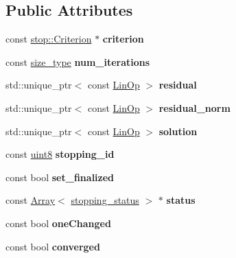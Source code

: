 \subsection*{Public Attributes}
\begin{DoxyCompactItemize}
\item 
\mbox{\label{structgko_1_1log_1_1criterion__data_aa0548110c547da9a8483927718884f4a}} 
const \hyperlink{classgko_1_1stop_1_1Criterion}{stop\+::\+Criterion} $\ast$ {\bfseries criterion}
\item 
\mbox{\label{structgko_1_1log_1_1criterion__data_afab8df7b4785439a9267bc652d6deb63}} 
const \hyperlink{namespacegko_a6e5c95df0ae4e47aab2f604a22d98ee7}{size\+\_\+type} {\bfseries num\+\_\+iterations}
\item 
\mbox{\label{structgko_1_1log_1_1criterion__data_adc825d1d8a8e1c69e172ee582319a82a}} 
std\+::unique\+\_\+ptr$<$ const \hyperlink{classgko_1_1LinOp}{Lin\+Op} $>$ {\bfseries residual}
\item 
\mbox{\label{structgko_1_1log_1_1criterion__data_a425258f5b1cb46ae3f117eace796a1f7}} 
std\+::unique\+\_\+ptr$<$ const \hyperlink{classgko_1_1LinOp}{Lin\+Op} $>$ {\bfseries residual\+\_\+norm}
\item 
\mbox{\label{structgko_1_1log_1_1criterion__data_a23bddbadadb1ce48d21d41f8ac515d10}} 
std\+::unique\+\_\+ptr$<$ const \hyperlink{classgko_1_1LinOp}{Lin\+Op} $>$ {\bfseries solution}
\item 
\mbox{\label{structgko_1_1log_1_1criterion__data_ae406ca3e9f745e24edf545d33efdd7ce}} 
const \hyperlink{namespacegko_a3950fc3732811a8563484e5098c31531}{uint8} {\bfseries stopping\+\_\+id}
\item 
\mbox{\label{structgko_1_1log_1_1criterion__data_a4c807636a64d3b1078572aac0c0ce95f}} 
const bool {\bfseries set\+\_\+finalized}
\item 
\mbox{\label{structgko_1_1log_1_1criterion__data_af795c317fb08a115e077fe30f27812c1}} 
const \hyperlink{classgko_1_1Array}{Array}$<$ \hyperlink{classgko_1_1stopping__status}{stopping\+\_\+status} $>$ $\ast$ {\bfseries status}
\item 
\mbox{\label{structgko_1_1log_1_1criterion__data_ac0008d49d33f2fa1f972fb98279bb162}} 
const bool {\bfseries one\+Changed}
\item 
\mbox{\label{structgko_1_1log_1_1criterion__data_aa8fe52a61886be70613da84cfb3868f8}} 
const bool {\bfseries converged}
\end{DoxyCompactItemize}


